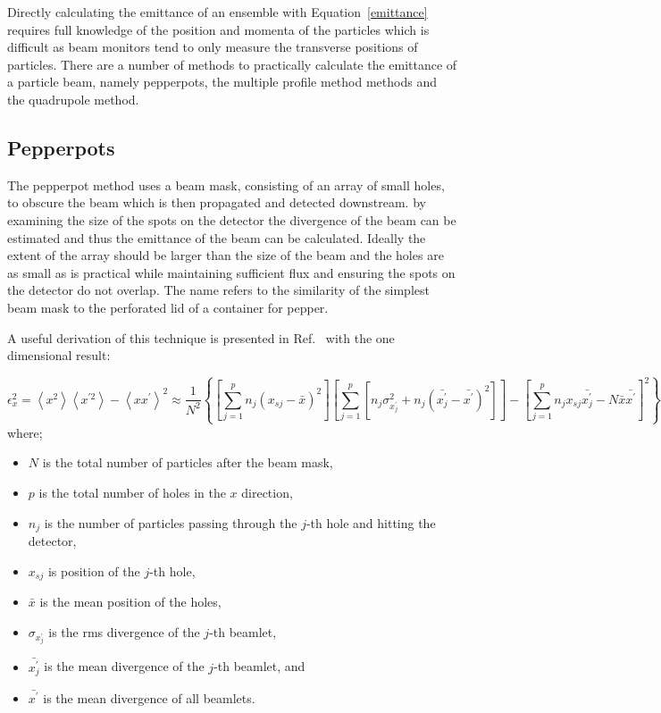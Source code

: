 Directly calculating the emittance of an ensemble with Equation~\ref{emittance} requires full knowledge of the position and momenta of the particles which is difficult as beam monitors tend to only measure the transverse positions of particles.
There are a number of methods to practically calculate the emittance of a particle beam, namely pepperpots, the multiple profile method methods and the quadrupole method.

\subsection{Pepperpots}

The pepperpot method uses a beam mask, consisting of an array of small holes, to obscure the beam which is then propagated and detected downstream.
by examining the size of the spots on the detector the divergence of the beam can be estimated and thus the emittance of the beam can be calculated.
Ideally the extent of the array should be larger than the size of the beam and the holes are as small as is practical while maintaining sufficient flux and ensuring the spots on the detector do not overlap.
The name refers to the similarity of the simplest beam mask to the perforated lid of a container for pepper.

A useful derivation of this technique is presented in Ref.~\cite{zhang_emittance_1996} with the one dimensional result:

\begin{dmath}\label{equation:pepperpot}
\epsilon_x^2 = \left\langle x^2\right\rangle \left\langle x^{\prime2}\right\rangle - \left\langle xx^\prime\right\rangle^2\allowbreak
\approx \frac{1}{N^2} \left\{\left[\sum_{j=1}^p{n_j\left(x_{sj}-\bar{x}\right)^2}\right] \left[ \sum_{j=1}^p{\left[n_j\sigma_{x_j^\prime}^2 + n_j\left(\bar{x_j^\prime}-\bar{x^\prime}\right)^2\right]}\right] - \left[ \sum_{j=1}^p{n_jx_{sj}\bar{x_j^\prime}-N\bar{x}\bar{x^\prime}}\right]^2\right\}
\end{dmath}
where;
\begin{itemize}
    \item $N$ is the total number of particles after the beam mask,
    \item $p$ is the total number of holes in the $x$ direction,
    \item $n_j$ is the number of particles passing through the $j$-th hole and hitting the detector,
    \item $x_{sj}$ is position of the $j$-th hole,
    \item $\bar{x}$ is the mean position of the holes,
    \item $\sigma_{x_j^\prime}$ is the \gls{rms} divergence of the $j$-th beamlet,
    \item $\bar{x_j^\prime}$ is the mean divergence of the $j$-th beamlet, and
    \item $\bar{x^\prime}$ is the mean divergence of all beamlets.
\end{itemize}

